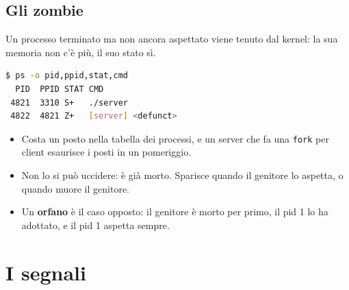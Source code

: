 \subsection{Gli zombie}

Un processo terminato ma non ancora aspettato viene tenuto dal kernel: la sua memoria non c'è più, il suo stato sì.

\begin{lstlisting}[language=bash]
$ ps -o pid,ppid,stat,cmd
  PID  PPID STAT CMD
 4821  3310 S+   ./server
 4822  4821 Z+   [server] <defunct>
\end{lstlisting}

\begin{itemize}
    \item Costa un posto nella tabella dei processi, e un server che fa una \texttt{fork} per client esaurisce i posti in un
          pomeriggio.
    \item Non lo si può uccidere: è già morto. Sparisce quando il genitore lo aspetta, o quando muore il genitore.
    \item Un \textbf{orfano} è il caso opposto: il genitore è morto per primo, il pid 1 lo ha adottato, e il pid 1 aspetta
          sempre.
\end{itemize}


\section{I segnali}

